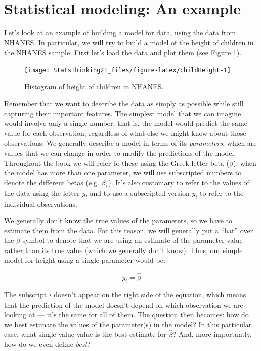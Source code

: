 \documentclass[12pt,]{book}
\theoremstyle{definition}
\theoremstyle{definition}
\theoremstyle{definition}
\theoremstyle{remark}
\begin{document}
\hypertarget{statistical-modeling-an-example}{%
\section{Statistical modeling: An example}\label{statistical-modeling-an-example}}

Let's look at an example of building a model for data, using the data from NHANES. In particular, we will try to build a model of the height of children in the NHANES sample. First let's load the data and plot them (see Figure \ref{fig:childHeight}).

\begin{figure}
\texttt{[image: StatsThinking21\_files/figure-latex/childHeight-1]} \caption{Histogram of height of children in NHANES.}\label{fig:childHeight}
\end{figure}

Remember that we want to describe the data as simply as possible while still capturing their important features. The simplest model that we can imagine would involve only a single number; that is, the model would predict the same value for each observation, regardless of what else we might know about those observations. We generally describe a model in terms of its \emph{parameters}, which are values that we can change in order to modify the predictions of the model. Throughout the book we will refer to these using the Greek letter beta (\(\beta\)); when the model has more than one parameter, we will use subscripted numbers to denote the different betas (e.g. \(\beta_1\)). It's also customary to refer to the values of the data using the letter \(y\), and to use a subscripted version \(y_i\) to refer to the individual observations.

We generally don't know the true values of the parameters, so we have to estimate them from the data. For this reason, we will generally put a ``hat'' over the \(\beta\) symbol to denote that we are using an estimate of the parameter value rather than its true value (which we generally don't know). Thus, our simple model for height using a single parameter would be:

\[
y_i = \hat{\beta}
\]

The subscript \(i\) doesn't appear on the right side of the equation, which means that the prediction of the model doesn't depend on which observation we are looking at --- it's the same for all of them. The question then becomes: how do we best estimate the values of the parameter(s) in the model? In this particular case, what single value value is the best estimate for \(\hat{\beta}\)? And, more importantly, how do we even define \emph{best}?
\end{document}

